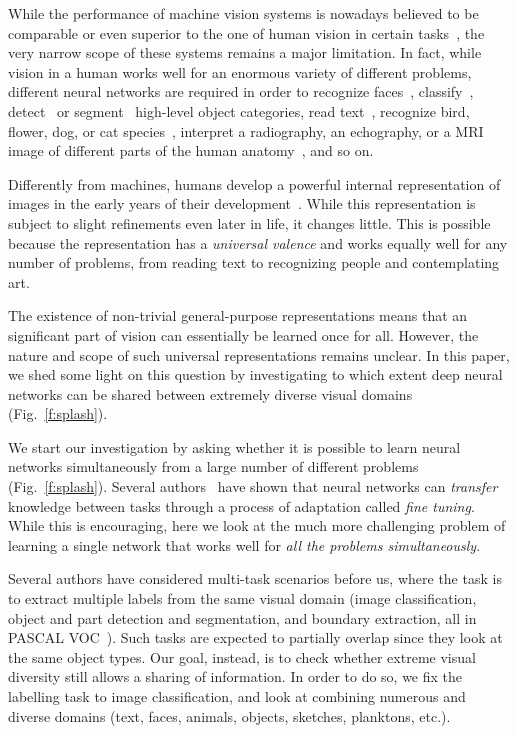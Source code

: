 \documentclass[10pt,twocolumn,letterpaper]{article}
\begin{document}
While the performance of machine vision systems is nowadays believed to be comparable or even superior to the one of human vision in certain tasks~\cite{he15delving}, the very narrow scope of these systems remains a major limitation. In fact, while vision in a human works well for an enormous variety of different problems, different neural networks are required in order to recognize faces~\cite{hong16faces,parkhi15deep,schroff15facenet:,taigman14deepface:}, classify~\cite{krizhevsky12imagenet, he16deep}, detect~\cite{ren15faster,liu16ssd:} or segment~\cite{dai16instance-aware} high-level object categories, read text~\cite{gupta16synthetic,jaderberg16reading}, recognize bird, flower, dog, or cat species~\cite{lin15bilinear}, interpret a radiography, an echography, or a MRI image of different parts of the human anatomy~\cite{jamaludin16spinenet:}, and so on. 

Differently from machines, humans develop a powerful internal representation of images in the early years of their development~\cite{atkinson02the-developing}. While this representation is subject to slight refinements even later in life, it changes little. This is possible because the representation has a \emph{universal valence} and works equally well for any number of problems, from reading text to recognizing people and contemplating art. 


The existence of non-trivial general-purpose representations means that an significant part of vision can essentially be learned once for all. However, the nature and scope of such universal representations remains unclear. In this paper, we shed some light on this question by investigating to which extent deep neural networks can be shared between extremely diverse visual domains (Fig.~\ref{f:splash}).

We start our investigation by asking whether it is possible to learn neural networks simultaneously from a large number of different problems (Fig.~\ref{f:splash}). Several authors~\cite{oquab14learning,razavian14cnn-features,yosinski14how-transferable} have shown that neural networks can \emph{transfer} knowledge between tasks through a process of adaptation called \emph{fine tuning}. While this is encouraging, here we look at the much more challenging problem of learning a single network that works well for \emph{all the problems simultaneously}.

Several authors have considered multi-task scenarios before us, where the task is to extract multiple labels from the same visual domain (\eg image classification, object and part detection and segmentation, and boundary extraction, all in PASCAL VOC~\cite{dai16instance-aware,bilen16integrated,kokkinos2016ubernet}). Such tasks are expected to partially overlap since they look at the same object types. Our goal, instead, is to check whether extreme visual diversity still allows a sharing of information. In order to do so, we fix the labelling task to image classification, and look at combining numerous and diverse domains (\eg text, faces, animals, objects, sketches, planktons, etc.).
\end{document}
